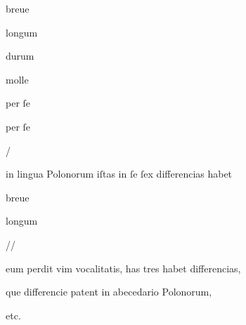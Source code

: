 { breue

 longum



 durum

 molle

 per ſe

 per ſe


/

 in lingua Polonorum iſtas in ſe ſex differencias habet       

 

   


 breue	

 longum

   //  

eum perdit vim vocalitatis, has tres habet differencias,

que differencie patent in abecedario Polonorum,

   etc.  



}

\endinput





















\catcode `\^^M=5

  \newtip{48}{Łoś niesłusznie uważa, że \textit{bika} w obu wypadkach
    napisano błędnie zamiast \textit{ƀyka}. Przykłady są bowiem podane
    w~pisowni dotychczasowej dla pokazania jej niewystarczalności do
    zróżnicowania wyrazów \textit{bika} i \textit{byka}.}

\obeylines






